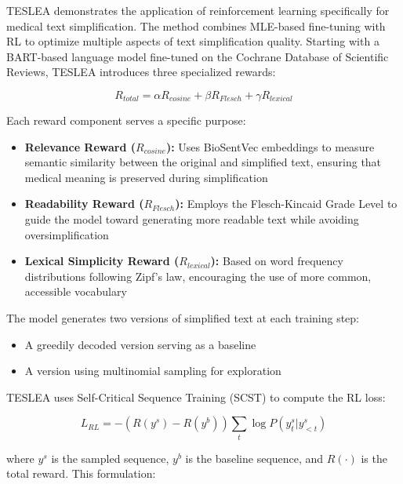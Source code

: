 TESLEA demonstrates the application of reinforcement learning specifically for medical text simplification. The method combines MLE-based fine-tuning with RL to optimize multiple aspects of text simplification quality. Starting with a BART-based language model fine-tuned on the Cochrane Database of Scientific Reviews, TESLEA introduces three specialized rewards:

\begin{equation}
    R_{total} = \alpha R_{cosine} + \beta R_{Flesch} + \gamma R_{lexical}
\end{equation}

Each reward component serves a specific purpose:

\begin{itemize}
    \item \textbf{Relevance Reward ($R_{cosine}$):} Uses BioSentVec embeddings to measure semantic similarity between the original and simplified text, ensuring that medical meaning is preserved during simplification
    
    \item \textbf{Readability Reward ($R_{Flesch}$):} Employs the Flesch-Kincaid Grade Level to guide the model toward generating more readable text while avoiding oversimplification
    
    \item \textbf{Lexical Simplicity Reward ($R_{lexical}$):} Based on word frequency distributions following Zipf's law, encouraging the use of more common, accessible vocabulary
\end{itemize}

The model generates two versions of simplified text at each training step:

\begin{itemize}
    \item A greedily decoded version serving as a baseline
    \item A version using multinomial sampling for exploration
\end{itemize}

TESLEA uses Self-Critical Sequence Training (SCST) to compute the RL loss:

\begin{equation}
    L_{RL} = -(R(y^s) - R(y^b))\sum_t \log P(y^s_t|y^s_{<t})
\end{equation}

where $y^s$ is the sampled sequence, $y^b$ is the baseline sequence, and $R(\cdot)$ is the total reward. This formulation:

